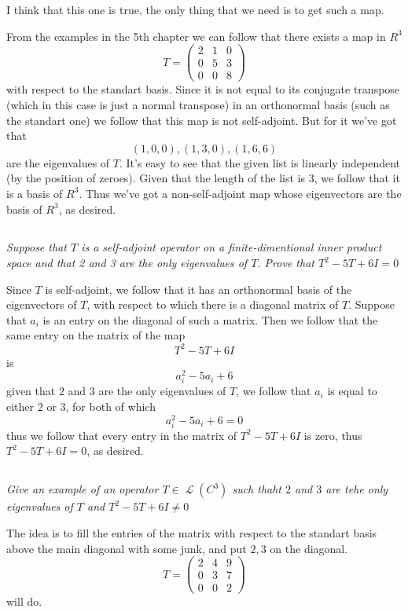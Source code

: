 \documentclass[11pt,oneside,titlepage]{book}
\DeclareMathOperator \map {\mathcal {L}}
\begin{document}
I think that this one is true, the only thing that we need is to get such a map.

From the examples in the 5th chapter we can follow that there exists a map in $R^3$
$$ T = 
\begin{pmatrix}
  2 & 1 & 0 \\
  0 & 5 & 3 \\
  0 & 0 & 8
\end{pmatrix}
$$
with respect to the standart basis. Since it is not equal to its conjugate transpose (which in
this case is just a normal transpose) in an orthonormal basis (such as the standart one) we
follow that this map is not self-adjoint. But for it we've got that
$$(1, 0, 0), (1, 3, 0), (1, 6, 6)$$
are the eigenvalues of $T$. It's easy to see that the given list is linearly independent (by the
position of zeroes). Given that the length of the list is 3, we follow that it is a basis of $R^3$.
Thus we've got a non-self-adjoint map whose eigenvectors are the basis of $R^3$, as desired.

\subsection{}

\textit{Suppose that $T$ is a self-adjoint operator on a finite-dimentional
  inner product space and that 2 and 3 are the only eigenvalues of $T$. Prove that
  $T^2 - 5T + 6I = 0$}

Since $T$ is self-adjoint, we follow that it has an orthonormal basis of the eigenvectors of $T$,
with respect to which there is a diagonal matrix of $T$. Suppose that $a_i$ is an entry on
the diagonal of such a matrix. Then we follow that the same entry on the matrix of the map
$$T^2 - 5T + 6I$$
is
$$a_i^2 - 5a_i + 6$$
given that $2$ and $3$ are the only eigenvalues of $T$, we follow that $a_i$ is equal to
either $2$ or $3$, for both of which
$$a_i^2 - 5a_i + 6 = 0$$
thus we follow that every entry in the matrix of 
$T^2 - 5T + 6I$ is zero, thus $T^2 - 5T + 6I = 0$, as desired.

\subsection{}

\textit{Give an example of an operator $T \in \map(C^3)$ such thaht $2$ and $3$ are tehe
  only eigenvalues of $T$ and $T^2 - 5T + 6I \neq 0$}

The idea is to fill the entries of the matrix with respect to the standart basis
above the main diagonal with some junk, and put $2, 3$ on the
diagonal.
$$T =
\begin{pmatrix}
  2 & 4 & 9 \\
  0 & 3 & 7 \\
  0 & 0 & 2
\end{pmatrix}
$$
will do.
\end{document}
